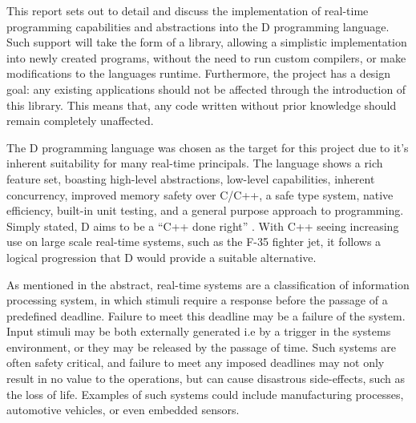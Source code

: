 






This report sets out to detail and discuss the implementation of real-time 
programming capabilities and abstractions into the D programming language. 
Such support will take the form of a library, allowing a simplistic implementation 
into newly created programs, without the need to run custom compilers, or make 
modifications to the languages runtime. Furthermore, the project has a design 
goal: any existing applications should not be affected through the introduction 
of this library. This means that, any code written without prior knowledge should 
remain completely unaffected. 
\par\bigskip\noindent
The D programming language was chosen as the target for this project due to it's 
inherent suitability for many real-time principals. The language shows a rich 
feature set, boasting high-level abstractions, low-level capabilities, inherent 
concurrency, improved memory safety over C/C++, a safe type 
system, native efficiency, built-in unit testing,  and a general purpose approach 
to programming. Simply stated, D aims to be a ``C++ done right'' \cite{qznc-tutorial}. 
With C++ seeing increasing use on large scale real-time systems, such as the F-35 
fighter jet, it follows a logical progression that D would provide a suitable 
alternative.
\par\bigskip\noindent
As mentioned in the abstract, real-time systems are a classification of 
information processing system, in which 
stimuli require a response before the passage of a predefined deadline. Failure 
to meet this deadline may be a failure of the system. Input 
stimuli may be both externally generated i.e by a trigger in the systems 
environment, or they may be released by the passage of time. Such systems are 
often safety critical, and failure to meet any imposed deadlines may not only 
result in no value to the operations, but can cause disastrous side-effects, 
such as the loss of life. Examples of such systems could include 
manufacturing processes, automotive vehicles, or even embedded sensors. 
